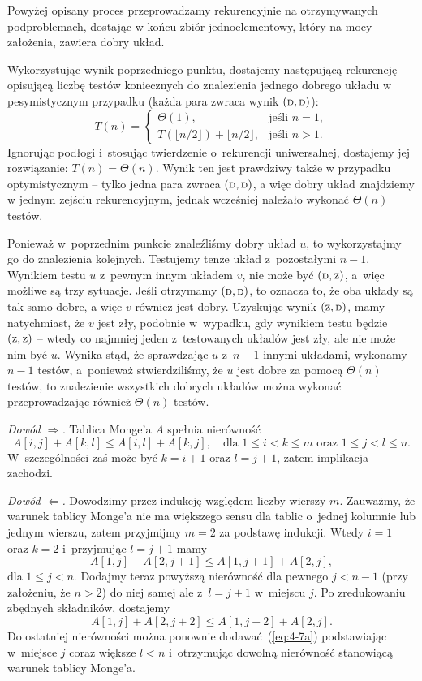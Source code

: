 Powyżej opisany proces przeprowadzamy rekurencyjnie na otrzymywanych podproblemach, dostając w końcu zbiór jednoelementowy, który na mocy założenia, zawiera dobry układ.

\subproblem %
Wykorzystując wynik poprzedniego punktu, dostajemy następującą rekurencję opisującą liczbę testów koniecznych do znalezienia jednego dobrego układu w pesymistycznym przypadku (każda para zwraca wynik $({\scriptstyle\rm D},{\scriptstyle\rm D})$):
\[
	T(n) =
	\begin{cases}
		\Theta(1), & \text{jeśli $n=1$}, \\
		T(\lfloor n/2\rfloor) + \lfloor n/2\rfloor, & \text{jeśli $n>1$}.
	\end{cases}
\]
Ignorując podłogi i~stosując twierdzenie o~rekurencji uniwersalnej, dostajemy jej rozwiązanie: $T(n)=\Theta(n)$. Wynik ten jest prawdziwy także w przypadku optymistycznym -- tylko jedna para zwraca $({\scriptstyle\rm D},{\scriptstyle\rm D})$, a więc dobry układ znajdziemy w jednym zejściu rekurencyjnym, jednak wcześniej należało wykonać $\Theta(n)$ testów.

Ponieważ w~poprzednim punkcie znaleźliśmy dobry układ $u$, to wykorzystajmy go do znalezienia kolejnych. Testujemy tenże układ z~pozostałymi $n-1$. Wynikiem testu $u$ z~pewnym innym układem $v$, nie może być $({\scriptstyle\rm D},{\scriptstyle\rm Z})$, a~więc możliwe są trzy sytuacje. Jeśli otrzymamy $({\scriptstyle\rm D},{\scriptstyle\rm D})$, to oznacza to, że oba układy są tak samo dobre, a więc $v$ również jest dobry. Uzyskując wynik $({\scriptstyle\rm Z},{\scriptstyle\rm D})$, mamy natychmiast, że $v$ jest zły, podobnie w~wypadku, gdy wynikiem testu będzie $({\scriptstyle\rm Z},{\scriptstyle\rm Z})$ -- wtedy co najmniej jeden z~testowanych układów jest zły, ale nie może nim być $u$. Wynika stąd, że sprawdzając $u$ z~$n-1$ innymi układami, wykonamy $n-1$ testów, a~ponieważ stwierdziliśmy, że $u$ jest dobre za pomocą $\Theta(n)$ testów, to znalezienie wszystkich dobrych układów można wykonać przeprowadzając również $\Theta(n)$ testów.


\subproblem %
\noindent\emph{Dowód $\Rightarrow$.} Tablica Monge'a $A$ spełnia nierówność
\[
	A[i,j]+A[k,l] \le A[i,l]+A[k,j], \quad\text{dla $1\le i<k\le m$ oraz $1\le j<l\le n$}.
\]
W~szczególności zaś może być $k=i+1$ oraz $l=j+1$, zatem implikacja zachodzi.
\bigskip

\noindent\emph{Dowód $\Leftarrow$.} Dowodzimy przez indukcję względem liczby wierszy $m$. Zauważmy, że warunek tablicy Monge'a nie ma większego sensu dla tablic o~jednej kolumnie lub jednym wierszu, zatem przyjmijmy $m=2$ za podstawę indukcji. Wtedy $i=1$ oraz $k=2$ i~przyjmując $l=j+1$ mamy
\[
	A[1,j]+A[2,j+1] \le A[1,j+1]+A[2,j], \tag{$*$}\label{eq:4-7a}
\]
dla $1\le j<n$. Dodajmy teraz powyższą nierówność dla pewnego $j<n-1$ (przy założeniu, że $n>2$) do niej samej ale z~$l=j+1$ w~miejscu $j$. Po zredukowaniu zbędnych składników, dostajemy
\[
	A[1,j]+A[2,j+2] \le A[1,j+2]+A[2,j].
\]
Do ostatniej nierówności można ponownie dodawać~(\ref{eq:4-7a}) podstawiając w~miejsce $j$ coraz większe $l<n$ i~otrzymując dowolną nierówność stanowiącą warunek tablicy Monge'a.

